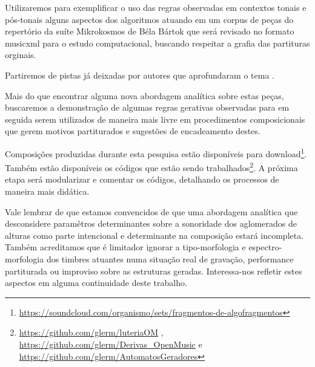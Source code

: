\documentclass[
	12pt,				%
	openright,			%
	twoside,			%
	a4paper,			%
	english,			%
	french,				%
	spanish,			%
	brazil				%
	]{abntex2}
\begin{document}
Utilizaremos para exemplificar o uso das regras observadas em contextos tonais e pós-tonais alguns aspectos dos algoritmos atuando em um corpus de peças do repertório da suíte Mikrokosmos de Béla Bártok que será revisado no formato musicxml para o estudo computacional, buscando respeitar a grafia das partituras orginais. 

Partiremos de pistas já deixadas por autores que aprofundaram o tema \cite{marshall1946analysis,suchoff1971guide, lendvai1971bela,antokoletz1984music,suchoff2004bartok,lester1989analytic}.

Mais do que encontrar alguma nova abordagem analítica sobre estas peças, buscaremos a demonstração de algumas regras gerativas observadas para em seguida serem utilizados de maneira mais livre em procedimentos composicionais que gerem motivos partiturados e sugestões de encadeamento destes.

Composições produzidas durante esta pesquisa estão disponíveis para download\footnote{\url{https://soundcloud.com/organismo/sets/fragmentos-de-algofragmentos}}. Também estão disponíveis os códigos que estão sendo trabalhados\footnote{\url{https://github.com/glerm/luteriaOM} , \url{https://github.com/glerm/Derivas_OpenMusic} e \url{https://github.com/glerm/AutomatosGeradores} }. A próxima etapa será modularizar e comentar os códigos, detalhando os processos de maneira mais didática.

Vale lembrar de que estamos convencidos de que uma abordagem analítica que desconsidere paramêtros determinantes sobre a sonoridade\cite{guigue2012} dos aglomerados de alturas como parte intencional e determinante na composição estará incompleta. Também acreditamos que é limitador ignorar a tipo-morfologia\cite{shaeffer1966traite} e espectro-morfologia\cite{smalley1997spectromorphology} dos timbres atuantes numa situação real de gravação, performance partiturada ou improviso sobre as estruturas geradas. Interessa-nos refletir estes aspectos em alguma continuidade deste trabalho.




\postextual

%

%
%
\end{document}
